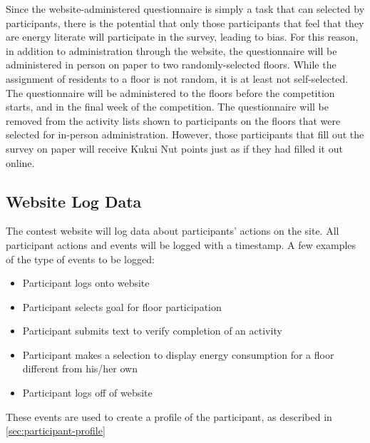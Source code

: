 Since the website-administered questionnaire is simply a task that can selected by participants, there is the potential that only those participants that feel that they are energy literate will participate in the survey, leading to bias. For this reason, in addition to administration through the website, the questionnaire will be administered in person on paper to two randomly-selected floors. While the assignment of residents to a floor is not random, it is at least not self-selected. The questionnaire will be administered to the floors before the competition starts, and in the final week of the competition. The questionnaire will be removed from the activity lists shown to participants on the floors that were selected for in-person administration. However, those participants that fill out the survey on paper will receive Kukui Nut points just as if they had filled it out online.

\subsection{Website Log Data}

The contest website will log data about participants' actions on the site. All participant actions and events will be logged with a timestamp. A few examples of the type of events to be logged:

\begin{itemize}
\item Participant logs onto website
\item Participant selects goal for floor participation
\item Participant submits text to verify completion of an activity
\item Participant makes a selection to display energy consumption for a floor different from his/her own
\item Participant logs off of website
\end{itemize}

These events are used to create a profile of the participant, as described in \autoref{sec:participant-profile}


